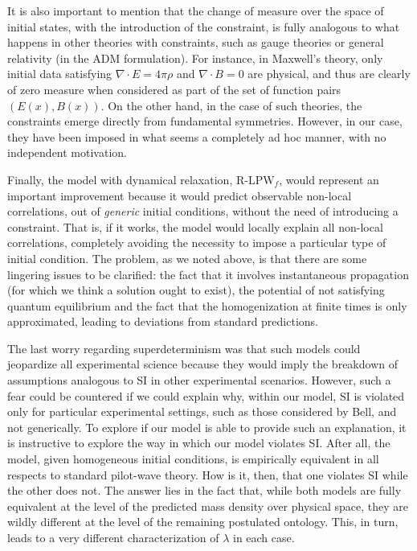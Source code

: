 \documentclass[letterpaper,12pt]{article}
\begin{document}
It is also important to mention that the change of measure over the space of initial states, with the introduction of the constraint, is fully analogous to what happens in other theories with constraints, such as gauge theories or general relativity (in the ADM formulation). For instance, in Maxwell's theory, only initial data satisfying $\nabla \cdot E = 4\pi \rho$ and $\nabla \cdot B =0$ are physical, and thus are clearly of zero measure when considered as part of the set of function pairs $ (E(x) , B(x))$. On the other hand, in the case of such theories, the constraints emerge directly from fundamental symmetries. However, in our case, they have been imposed in what seems a completely ad hoc manner, with no independent motivation.

Finally, the model with dynamical relaxation, $\text{R-LPW}_f$, would represent an important improvement because it would predict observable non-local correlations, out of \emph{generic} initial conditions, without the need of introducing a constraint. That is, if it works, the model would locally explain all non-local correlations, completely avoiding the necessity to impose a particular type of initial condition. The problem, as we noted above, is that there are some lingering issues to be clarified: the fact that it involves instantaneous propagation (for which we think a solution ought to exist), the potential of not satisfying quantum equilibrium and the fact that the homogenization at finite times is only approximated, leading to deviations from standard predictions.

The last worry regarding superdeterminism was that such models could jeopardize all experimental science because they would imply the breakdown of assumptions analogous to SI in other experimental scenarios. However, such a fear could be countered if we could explain why, within our model, SI is violated only for particular experimental settings, such as those considered by Bell, and not generically. To explore if our model is able to provide such an explanation, it is instructive to explore the way in which our model violates SI. After all, the model, given homogeneous initial conditions, is empirically equivalent in all respects to standard pilot-wave theory. How is it, then, that one violates SI while the other does not. The answer lies in the fact that, while both models are fully equivalent at the level of the predicted mass density over physical space, they are wildly different at the level of the remaining postulated ontology. This, in turn, leads to a very different characterization of $\lambda$ in each case.
\end{document}
